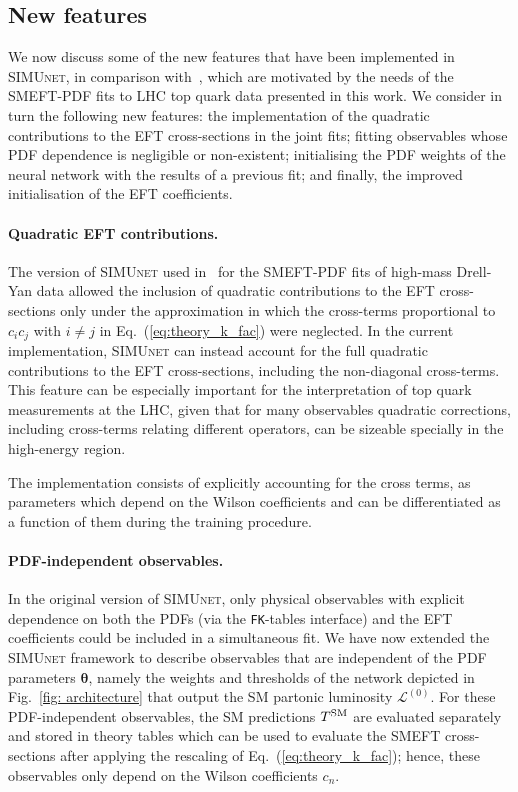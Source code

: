 \documentclass[withindex,glossary]{cam-thesis}
\newcommand{\simunet}{\textsc{SIMUnet}}
\begin{document}
\subsection{New features}
\label{sec:new_simunet}

We now discuss some of the new features that have been implemented in \simunet{}, in comparison
with~\cite{Iranipour:2022iak}, which are motivated by the needs of the SMEFT-PDF fits
to LHC top quark data presented in this work.
%
We consider in turn the following new features: the implementation of the quadratic contributions
to the EFT cross-sections in the joint fits; fitting observables whose PDF dependence
is negligible or non-existent; initialising the PDF weights of the neural network with the results
of a previous fit; and finally, the improved initialisation of the EFT
coefficients. 

\paragraph{Quadratic EFT contributions.}
%
The  version of \simunet{} used in~\cite{Iranipour:2022iak} for the SMEFT-PDF fits
of high-mass Drell-Yan data allowed the inclusion of quadratic contributions
to the EFT cross-sections only under the approximation in which the cross-terms proportional to $c_ic_j$
with $i\ne j$ in Eq.~(\ref{eq:theory_k_fac}) were neglected.
%
In the current implementation,  \simunet{} can instead account for the full quadratic
contributions to the EFT cross-sections, including the non-diagonal cross-terms.
%
This feature can be especially important for the interpretation of top quark
measurements at the LHC, given that for many observables quadratic corrections, including
cross-terms relating different operators, can be sizeable specially in the high-energy region.
%

The implementation consists of explicitly accounting for the cross terms, as
parameters which depend on the Wilson coefficients and can be differentiated as
a function of them during the training procedure. 

\paragraph{PDF-independent observables.}
%
In the original version of \simunet{}, only physical observables with explicit
dependence on both the PDFs (via the {\tt FK}-tables interface) and the EFT coefficients
  could be included in a simultaneous fit.
  We have now extended the \simunet{} framework
  to describe observables that are independent of the PDF parameters $\pmb{\theta}$,
  namely the weights and thresholds of the network depicted in Fig.~\ref{fig: architecture}
  that output the SM partonic luminosity $\mathcal{L}^{(0)}$.
  For these PDF-independent observables, the SM predictions $T^{\rm SM}$ are evaluated separately
  and stored in theory tables which can be used to evaluate the SMEFT cross-sections
  after applying the rescaling of Eq.~(\ref{eq:theory_k_fac});
  hence, these observables only depend on
the Wilson coefficients $c_n$.
\end{document}
